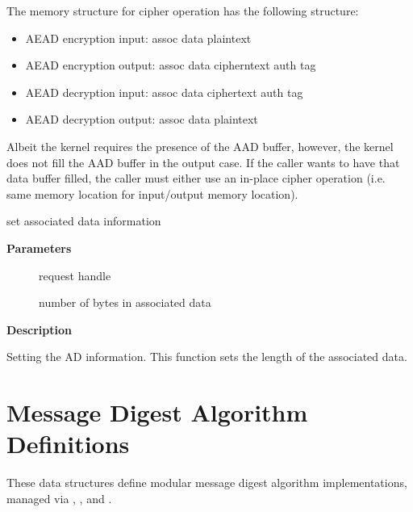 \documentclass[a4paper,8pt,english]{sphinxmanual}
\begin{document}
The memory structure for cipher operation has the following structure:
\begin{itemize}
\item {} 
AEAD encryption input:  assoc data \textbar{}\textbar{} plaintext

\item {} 
AEAD encryption output: assoc data \textbar{}\textbar{} cipherntext \textbar{}\textbar{} auth tag

\item {} 
AEAD decryption input:  assoc data \textbar{}\textbar{} ciphertext \textbar{}\textbar{} auth tag

\item {} 
AEAD decryption output: assoc data \textbar{}\textbar{} plaintext

\end{itemize}

Albeit the kernel requires the presence of the AAD buffer, however,
the kernel does not fill the AAD buffer in the output case. If the
caller wants to have that data buffer filled, the caller must either
use an in-place cipher operation (i.e. same memory location for
input/output memory location).

\begin{fulllineitems}
\label{crypto/api-aead:c.aead_request_set_ad}
set associated data information

\end{fulllineitems}


\textbf{Parameters}
\begin{description}
\item[{}] \leavevmode
request handle

\item[{}] \leavevmode
number of bytes in associated data

\end{description}

\textbf{Description}

Setting the AD information.  This function sets the length of
the associated data.


\section{Message Digest Algorithm Definitions}
\label{crypto/api-digest:message-digest-algorithm-definitions}\label{crypto/api-digest::doc}
These data structures define modular message digest algorithm
implementations, managed via ,
,  and
.
\end{document}
